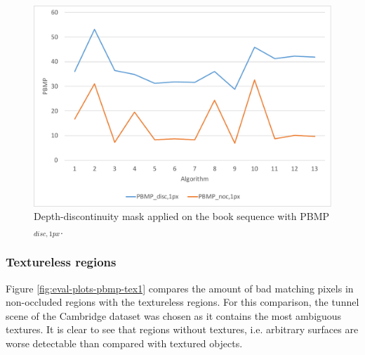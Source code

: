 \begin{figure}[h!]
\centering
\includegraphics[width=1.0\textwidth]{src/images/evaluation/plots/01-book-pbmp-disc-1.pdf}
\caption[Chart of depth-discontinuity mask]{Depth-discontinuity mask applied on the book sequence with PBMP$_{disc,1px}$.}
\label{fig:eval-plots-pbmp-disc1}
\end{figure}

\subsubsection{Textureless regions}

\noindent Figure \ref{fig:eval-plots-pbmp-tex1} compares the amount of bad matching pixels in non-occluded regions with the textureless regions.
For this comparison, the tunnel scene of the Cambridge dataset was chosen as it contains the most ambiguous textures.
It is clear to see that regions without textures, i.e. arbitrary surfaces are worse detectable than compared with textured objects.

\begin{table}[h!]
\centering
{}
\caption[Result table for tunnel scene]{Result table for tunnel scene of Cambridge dataset}
\label{tab:eval:tex:tunnel:overview}
\end{table}

